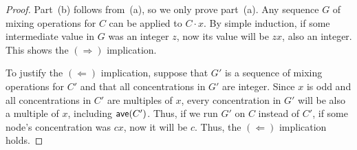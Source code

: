 \begin{proof}
Part~(b) follows from~(a), so we only prove part~(a).
Any sequence $G$ of mixing operations for $C$ can be applied to $C\cdot x$. 
By simple induction,
if some intermediate value in $G$ was an integer $z$, now its value will be $z x$,
also an integer. This shows the $(\Rightarrow)$ implication.

To justify the $(\Leftarrow)$ implication, 
suppose that $G'$ is a sequence of mixing operations for $C'$ and that all
concentrations in $G'$ are integer. 
Since $x$ is odd and all concentrations in $C'$ are multiples of $x$, 
every concentration in $G'$ will be also a multiple of $x$, including  ${\textsf{ave}}(C')$.  
Thus, if  we run $G'$ on $C$ instead of $C'$, if some node's concentration
was $c x$, now it will be $c$.
Thus, the $(\Leftarrow)$ implication holds.
\end{proof}







